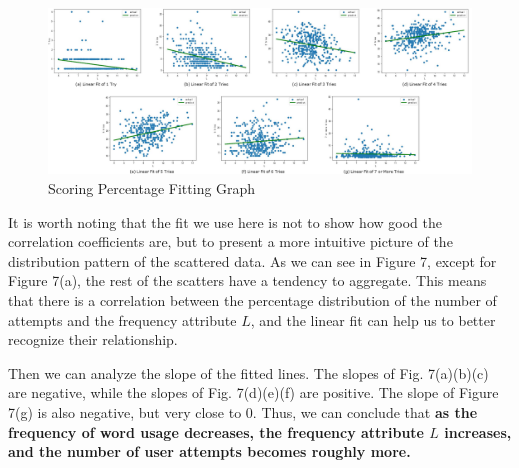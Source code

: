 \documentclass[12pt]{article}
\begin{document}
\begin{figure}[H]
    \centering
    \includegraphics[scale=0.53]{1_2.png}
    \caption{Scoring Percentage Fitting Graph}
\end{figure}

It is worth noting that the fit we use here is not to show how good the correlation coefficients are, but to present a more intuitive picture of the distribution pattern of the scattered data.
As we can see in Figure 7, except for Figure 7(a), the rest of the scatters have a tendency to aggregate.
This means that there is a correlation between the percentage distribution of the number of attempts and the frequency attribute $L$, and the linear fit can help us to better recognize their relationship.


Then we can analyze the slope of the fitted lines. The slopes of Fig. 7(a)(b)(c) are negative, while the slopes of Fig. 7(d)(e)(f) are positive. The slope of Figure 7(g) is also negative, but very close to 0. Thus, we can conclude that \textbf{as the frequency of word usage decreases, 
the frequency attribute $L$ increases, and the number of user attempts becomes roughly more.}
\end{document}
